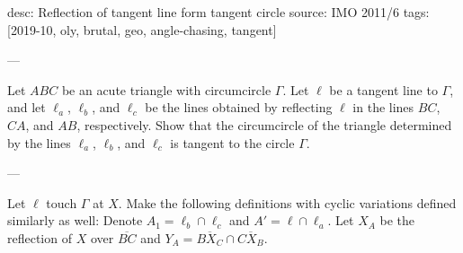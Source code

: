 desc: Reflection of tangent line form tangent circle
source: IMO 2011/6
tags: [2019-10, oly, brutal, geo, angle-chasing, tangent]

---

Let $ABC$ be an acute triangle with circumcircle $\Gamma$. Let $\ell$ be a tangent line to $\Gamma$, and let $\ell_a$, $\ell_b$, and $\ell_c$ be the lines obtained by reflecting $\ell$ in the lines $BC$, $CA$, and $AB$, respectively. Show that the circumcircle of the triangle determined by the lines $\ell_a$, $\ell_b$, and $\ell_c$ is tangent to the circle $\Gamma$.

---

Let $\ell$ touch $\Gamma$ at $X$. Make the following definitions with cyclic variations defined similarly as well: Denote $A_1=\ell_b\cap\ell_c$ and $A'=\ell\cap\ell_a$. Let $X_A$ be the reflection of $X$ over $\overline{BC}$ and $Y_A=\overline{BX_C}\cap\overline{CX_B}$.
